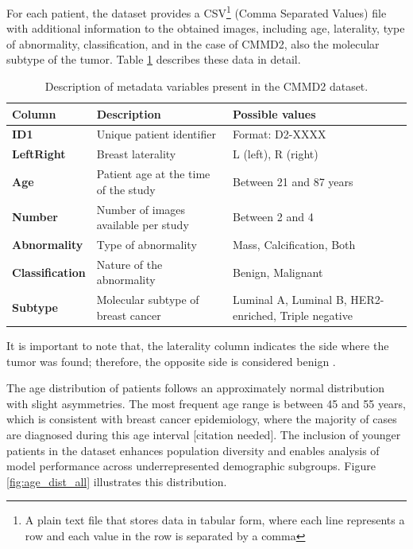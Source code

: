 \documentclass[a4paper,10pt]{book}
\begin{document}
For each patient, the dataset provides a CSV\footnote{A plain text file that stores data in tabular form, where each line represents a row and each value in the row is separated by a comma} (Comma Separated Values) file with additional information to the obtained images, including age, laterality, type of abnormality, classification, and in the case of CMMD2, also the molecular subtype of the tumor. Table \ref{tab:cmmd2_metadata} describes these data in detail.

\begin{table}[h!]
	\caption[CMMD2 metadata description]{Description of metadata variables present in the CMMD2 dataset.}
	\centering
	\begin{tabular}{>{\bfseries}l p{5cm} p{6cm}}
		\toprule
		\textbf{Column} & \textbf{Description}                 & \textbf{Possible values}                             \\
		\midrule
		ID1             & Unique patient identifier            & Format: D2-XXXX                                      \\
		LeftRight       & Breast laterality                    & L (left), R (right)                                  \\
		Age             & Patient age at the time of the study & Between 21 and 87 years                              \\
		Number          & Number of images available per study & Between 2 and 4                                      \\
		Abnormality     & Type of abnormality                  & Mass, Calcification, Both                            \\
		Classification  & Nature of the abnormality            & Benign, Malignant                                    \\
		Subtype         & Molecular subtype of breast cancer   & Luminal A, Luminal B, HER2-enriched, Triple negative \\
		\bottomrule
	\end{tabular}

	\label{tab:cmmd2_metadata}
\end{table}

It is important to note that, the laterality column indicates the side where the tumor was found; therefore, the opposite side is considered benign \cite{cai_online_2023}.

The age distribution of patients follows an approximately normal distribution with slight asymmetries. The most frequent age range is between 45 and 55 years, which is consistent with breast cancer epidemiology, where the majority of cases are diagnosed during this age interval [citation needed]. The inclusion of younger patients in the dataset enhances population diversity and enables analysis of model performance across underrepresented demographic subgroups. Figure \ref{fig:age_dist_all} illustrates this distribution.
\end{document}
